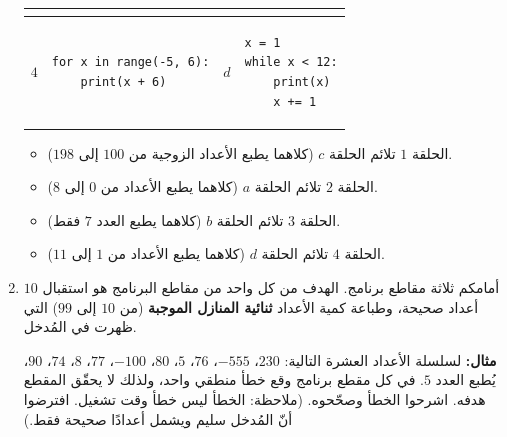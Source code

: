 \documentclass[14pt]{extarticle}
\begin{document}
\begin{enumerate}[label=\textbf{تمرين \arabic*:}, wide=0pt, itemsep=2.2em]
{\begin{longtable}{|C{0.9cm}|p{5.8cm}|C{0.9cm}|p{5.8cm}|}
\begin{pycell}
\end{pycell}
\\ \hline
$4$ &
\begin{pycell}
\begin{english}
\begin{verbatim}
for x in range(-5, 6):
    print(x + 6)
\end{verbatim}
\end{english}
\end{pycell}
& $d$ &
\begin{pycell}
\begin{english}
\begin{verbatim}
x = 1
while x < 12:
    print(x)
    x += 1
\end{verbatim}
\end{english}
\end{pycell}
\\ \hline
\end{longtable}}

\ifwithsols
\begin{boxSolution}
\begin{itemize}
\item الحلقة $1$ تلائم الحلقة $c$ (كلاهما يطبع الأعداد الزوجية من $100$ إلى $198$).
\item الحلقة $2$ تلائم الحلقة $a$ (كلاهما يطبع الأعداد من $0$ إلى $8$).
\item الحلقة $3$ تلائم الحلقة $b$ (كلاهما يطبع العدد $7$ فقط).
\item الحلقة $4$ تلائم الحلقة $d$ (كلاهما يطبع الأعداد من $1$ إلى $11$).
\end{itemize}
\end{boxSolution}
\fi
\filbreak


\item أمامكم ثلاثة مقاطع برنامج. الهدف من كل واحد من مقاطع البرنامج هو استقبال $10$ أعداد صحيحة، وطباعة كمية الأعداد \textbf{ثنائية المنازل الموجبة} (من $10$ إلى $99$) التي ظهرت في المُدخل.

\textbf{مثال:} لسلسلة الأعداد العشرة التالية: $230$، $-555$، $76$، $5$، $80$، $-100$، $77$، $8$، $74$، $90$، يُطبع العدد $5$.
في كل مقطع برنامج وقع خطأ منطقي واحد، ولذلك لا يحقّق المقطع هدفه. اشرحوا الخطأ وصحّحوه.
(ملاحظة: الخطأ ليس خطأ وقت تشغيل. افترضوا أنّ المُدخل سليم ويشمل أعدادًا صحيحة فقط.)

\begin{enumerate}[label=\textbf{مقطع \alph*:}, wide=0pt, itemsep=1.5em]


\end{enumerate}
\end{enumerate}
\end{document}
